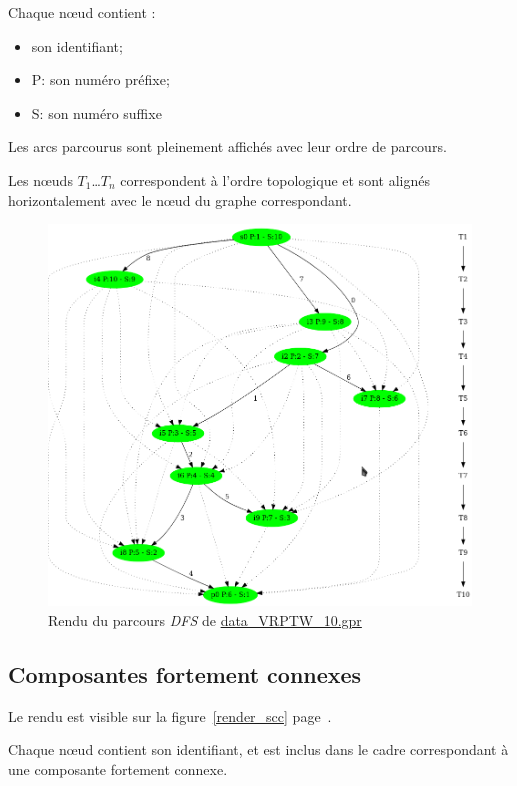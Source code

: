 \documentclass{scrreprt}
\begin{document}
	Chaque nœud contient :
	\begin{itemize}
		\item son identifiant;
		\item P: son numéro préfixe;
		\item S: son numéro suffixe
	\end{itemize}

	Les arcs parcourus sont pleinement affichés avec leur ordre de parcours.

	Les nœuds $T_1$…$T_n$ correspondent à l'ordre topologique et sont alignés horizontalement avec le nœud du graphe correspondant.

	\begin{figure}[!h]
		\begin{center}
			\includegraphics[scale=0.7]{render_dfs}
		\end{center}
		\caption{\label{render_dfs} Rendu du parcours \textit{DFS} de \url{data_VRPTW_10.gpr}}
	\end{figure}

	\newpage
	
	\subsection{Composantes fortement connexes}
	Le rendu est visible sur la figure~\ref{render_scc} page~\pageref{render_scc}.
	
	Chaque nœud contient son identifiant, et est inclus dans le cadre correspondant à une composante fortement connexe.
	
\end{document}

